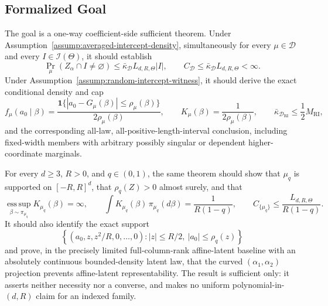 \subsection{Formalized Goal}

The goal is a one-way coefficient-side sufficient theorem.  Under
Assumption~\ref{assump:averaged-intercept-density}, simultaneously for
every $\mu\in\mathcal D$ and every $I\in\mathscr I(\Theta)$, it should
establish
\[
\Pr_\mu(Z_\alpha\cap I\neq\varnothing)
\leq\bar\kappa_{\mathcal D}L_{d,R,\Theta}|I|,
\qquad
C_{\mathcal D}\leq
\bar\kappa_{\mathcal D}L_{d,R,\Theta}<\infty.
\]
Under Assumption~\ref{assump:random-intercept-witness}, it should derive
the exact conditional density and cap
\[
f_\mu(a_0\mid\beta)
=\frac{\mathbf 1\{|a_0-G_\mu(\beta)|\leq\rho_\mu(\beta)\}}
       {2\rho_\mu(\beta)},
\qquad
K_\mu(\beta)=\frac{1}{2\rho_\mu(\beta)},
\qquad
\bar\kappa_{\mathcal D_{\mathrm{RI}}}
\leq\frac12M_{\mathrm{RI}},
\]
and the corresponding all-law, all-positive-length-interval conclusion,
including fixed-width members with arbitrary possibly singular or
dependent higher-coordinate marginals.

For every $d\geq3$, $R>0$, and $q\in(0,1)$, the same theorem should show
that $\mu_q$ is supported on $[-R,R]^d$, that $\rho_q(Z)>0$ almost surely,
and that
\[
\operatorname*{ess\,sup}_{\beta\sim\pi_{\mu_q}}
K_{\mu_q}(\beta)=\infty,
\qquad
\int K_{\mu_q}(\beta)\,\pi_{\mu_q}(d\beta)
=\frac{1}{R(1-q)},
\qquad
C_{\{\mu_q\}}\leq\frac{L_{d,R,\Theta}}{R(1-q)}.
\]
It should also identify the exact support
\[
\left\{(a_0,z,z^2/R,0,\ldots,0):
|z|\leq R/2,\ |a_0|\leq\rho_q(z)\right\}
\]
and prove, in the precisely limited full-column-rank affine-latent
baseline with an absolutely continuous bounded-density latent law, that
the curved $(\alpha_1,\alpha_2)$ projection prevents affine-latent
representability.  The result is sufficient only: it asserts neither
necessity nor a converse, and makes no uniform polynomial-in-$(d,R)$
claim for an indexed family.
